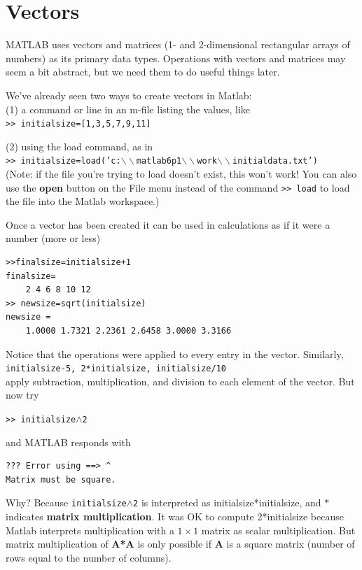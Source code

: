 \documentclass [11pt]{article}
\newcommand{\ttt}[1]{\texttt{#1}}
\newcommand{\tab}{\hspace*{0.5in}}
\numberwithin{exercise}{section}
\begin{document}
\section{Vectors}
\vspace{-0.15in} 
MATLAB uses vectors and matrices (1- and 2-dimensional rectangular arrays of 
numbers) as its primary data types. Operations with vectors and matrices may 
seem a bit abstract, but we need them to do useful things later. 

We've already seen two ways to create vectors in Matlab: \\
(1) a command or line in an m-file listing the values, like \\ 
\tab \ttt{>> initialsize=[1,3,5,7,9,11]} 

(2) using the load command, as in\\ 
\tab \ttt{>> initialsize=load('c:$\backslash \backslash $matlab6p1$\backslash 
\backslash $work$\backslash \backslash $initialdata.txt')} \\ 
(Note: if the file you're trying to load doesn't exist, this won't work!
You can also use the \textbf{open} button on the File menu instead of the command 
\ttt{>> load} to load the file into the Matlab workspace.) 

Once a vector has been created it can be used in calculations as if it were 
a number (more or less) 
\begin{verbatim}
>>finalsize=initialsize+1 
finalsize=
    2 4 6 8 10 12
>> newsize=sqrt(initialsize)
newsize = 
    1.0000 1.7321 2.2361 2.6458 3.0000 3.3166
\end{verbatim} 
Notice that the operations were applied to every entry in the vector. 
Similarly, \\
\tab \ttt{initialsize-5, 2*initialsize, initialsize/10} \\
apply subtraction, multiplication, and division to each element of the 
vector. But now try

\tab \ttt{>> initialsize$\wedge$2}

and MATLAB responds with
\begin{verbatim}
??? Error using ==> ^
Matrix must be square.
\end{verbatim} 

Why? Because \ttt{initialsize$\wedge$2} is interpreted as initialsize*initialsize, and 
$*$ indicates \textbf{matrix multiplication}. It was OK to compute 
2*initialsize because Matlab interprets multiplication with a $1 \times 1$ matrix
as scalar multiplication. But matrix multiplication of \textbf{A*A} is only 
possible if \textbf{A} is a square matrix (number of rows equal to the 
number of columns). 
\end{document}
